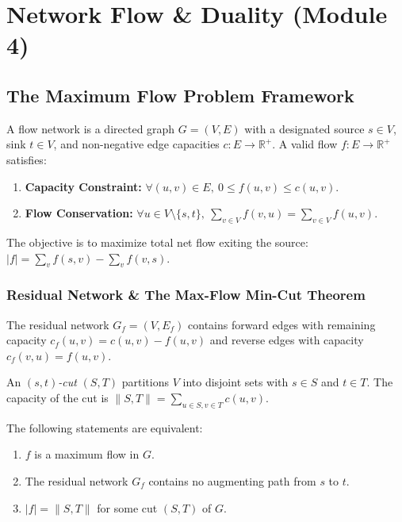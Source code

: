 \chapter{Network Flow \& Duality (Module 4)}
\label{ch:network_flow}

\section{The Maximum Flow Problem Framework}
A flow network is a directed graph $G = (V, E)$ with a designated source $s \in V$, sink $t \in V$, and non-negative edge capacities $c: E \to \mathbb{R}^+$. A valid flow $f: E \to \mathbb{R}^+$ satisfies:
\begin{enumerate}
    \item \textbf{Capacity Constraint:} $\forall (u, v) \in E, \ 0 \le f(u, v) \le c(u, v)$.
    \item \textbf{Flow Conservation:} $\forall u \in V \setminus \{s, t\}, \ \sum_{v \in V} f(v, u) = \sum_{v \in V} f(u, v)$.
\end{enumerate}
The objective is to maximize total net flow exiting the source: $|f| = \sum_{v} f(s, v) - \sum_{v} f(v, s)$.

\subsection{Residual Network \& The Max-Flow Min-Cut Theorem}
The residual network $G_f = (V, E_f)$ contains forward edges with remaining capacity $c_f(u, v) = c(u, v) - f(u, v)$ and reverse edges with capacity $c_f(v, u) = f(u, v)$. 

An \textit{$(s, t)$-cut} $(S, T)$ partitions $V$ into disjoint sets with $s \in S$ and $t \in T$. The capacity of the cut is $\|S, T\| = \sum_{u \in S, v \in T} c(u, v)$.
\begin{theorem}
The following statements are equivalent:
\begin{enumerate}
    \item $f$ is a maximum flow in $G$.
    \item The residual network $G_f$ contains no augmenting path from $s$ to $t$.
    \item $|f| = \|S, T\|$ for some cut $(S, T)$ of $G$.
\end{enumerate}
\end{theorem}

